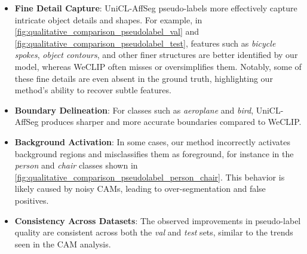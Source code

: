 \begin{itemize}
    \item \textbf{Fine Detail Capture}: UniCL-AffSeg pseudo-labels more effectively capture intricate object details and shapes. For example, in \autoref{fig:qualitative_comparison_pseudolabel_val} and \autoref{fig:qualitative_comparison_pseudolabel_test}, features such as \textit{bicycle spokes}, \textit{object contours}, and other finer structures are better identified by our model, whereas WeCLIP often misses or oversimplifies them. Notably, some of these fine details are even absent in the ground truth, highlighting our method’s ability to recover subtle features.
    
    \item \textbf{Boundary Delineation}: For classes such as \textit{aeroplane} and \textit{bird}, UniCL-AffSeg produces sharper and more accurate boundaries compared to WeCLIP.
    
    \item \textbf{Background Activation}: In some cases, our method incorrectly activates background regions and misclassifies them as foreground, for instance in the \textit{person} and \textit{chair} classes shown in \autoref{fig:qualitative_comparison_pseudolabel_person_chair}. This behavior is likely caused by noisy CAMs, leading to over-segmentation and false positives.
    
    \item \textbf{Consistency Across Datasets}: The observed improvements in pseudo-label quality are consistent across both the \textit{val} and \textit{test} sets, similar to the trends seen in the CAM analysis.
\end{itemize}





